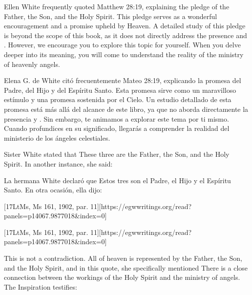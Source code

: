 Ellen White frequently quoted Matthew 28:19, explaining the pledge of the Father, the Son, and the Holy Spirit. This pledge serves as a wonderful encouragement and a promise upheld by Heaven. A detailed study of this pledge is beyond the scope of this book, as it does not directly address the presence and . However, we encourage you to explore this topic for yourself. When you delve deeper into its meaning, you will come to understand the reality of the ministry of heavenly angels.


Elena G. de White citó frecuentemente Mateo 28:19, explicando la promesa del Padre, del Hijo y del Espíritu Santo. Esta promesa sirve como un maravilloso estímulo y una promesa sostenida por el Cielo. Un estudio detallado de esta promesa está más allá del alcance de este libro, ya que no aborda directamente la presencia y . Sin embargo, te animamos a explorar este tema por ti mismo. Cuando profundices en su significado, llegarás a comprender la realidad del ministerio de los ángeles celestiales.


Sister White stated that  These three are the Father, the Son, and the Holy Spirit. In another instance, she said:


La hermana White declaró que  Estos tres son el Padre, el Hijo y el Espíritu Santo. En otra ocasión, ella dijo:


[17LtMs, Ms 161, 1902, par. 11][https://egwwritings.org/read?panels=p14067.9877018&index=0]


[17LtMs, Ms 161, 1902, par. 11][https://egwwritings.org/read?panels=p14067.9877018&index=0]


This is not a contradiction. All of heaven is represented by the Father, the Son, and the Holy Spirit, and in this quote, she specifically mentioned  There is a close connection between the workings of the Holy Spirit and the ministry of angels. The Inspiration testifies:


